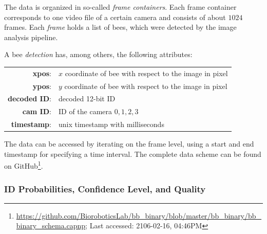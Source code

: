 The data is organized in so-called \emph{frame containers}.
Each frame container corresponds to one video file of a certain camera and consists of about $1024$ frames.
Each \emph{frame} holds a list of bees, which were detected by the image analysis pipeline.

A bee \emph{detection} has, among others, the following attributes:

\begin{table}[!h]
\centering
\begin{tabular}{rl}
\textbf{xpos}: & $x$ coordinate of bee with respect to the image in pixel \\
\textbf{ypos}: & $y$ coordinate of bee with respect to the image in pixel \\
\textbf{decoded ID}: & decoded 12-bit ID \\
\textbf{cam ID}: & ID of the camera ${0,1,2,3}$ \\
\textbf{timestamp}: & unix timestamp with milliseconds\\
\end{tabular}
\end{table}

The data can be accessed by iterating on the frame level, using a start and end time\-stamp for specifying a time interval. The complete data scheme can be found on GitHub\footnote{\url{https://github.com/BioroboticsLab/bb_binary/blob/master/bb_binary/bb_binary_schema.capnp}; Last accessed: 2106-02-16, 04:46PM}. 


\subsubsection{ID Probabilities, Confidence Level, and Quality}
\label{subsec:confidence}

